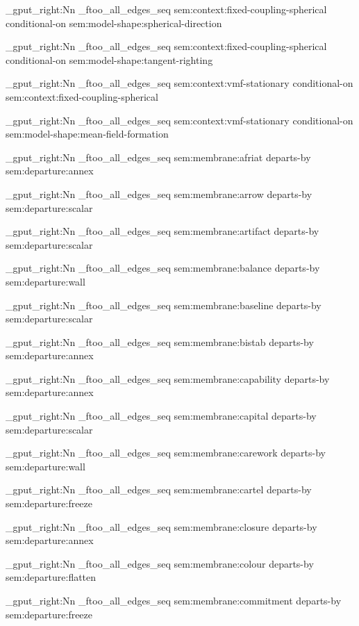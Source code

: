\seq_gput_right:Nn \g_ftoo_all_edges_seq { { sem:context:fixed-coupling-spherical } { conditional-on } { sem:model-shape:spherical-direction } }

\seq_gput_right:Nn \g_ftoo_all_edges_seq { { sem:context:fixed-coupling-spherical } { conditional-on } { sem:model-shape:tangent-righting } }

\seq_gput_right:Nn \g_ftoo_all_edges_seq { { sem:context:vmf-stationary } { conditional-on } { sem:context:fixed-coupling-spherical } }

\seq_gput_right:Nn \g_ftoo_all_edges_seq { { sem:context:vmf-stationary } { conditional-on } { sem:model-shape:mean-field-formation } }

\seq_gput_right:Nn \g_ftoo_all_edges_seq { { sem:membrane:afriat } { departs-by } { sem:departure:annex } }

\seq_gput_right:Nn \g_ftoo_all_edges_seq { { sem:membrane:arrow } { departs-by } { sem:departure:scalar } }

\seq_gput_right:Nn \g_ftoo_all_edges_seq { { sem:membrane:artifact } { departs-by } { sem:departure:scalar } }

\seq_gput_right:Nn \g_ftoo_all_edges_seq { { sem:membrane:balance } { departs-by } { sem:departure:wall } }

\seq_gput_right:Nn \g_ftoo_all_edges_seq { { sem:membrane:baseline } { departs-by } { sem:departure:scalar } }

\seq_gput_right:Nn \g_ftoo_all_edges_seq { { sem:membrane:bistab } { departs-by } { sem:departure:annex } }

\seq_gput_right:Nn \g_ftoo_all_edges_seq { { sem:membrane:capability } { departs-by } { sem:departure:annex } }

\seq_gput_right:Nn \g_ftoo_all_edges_seq { { sem:membrane:capital } { departs-by } { sem:departure:scalar } }

\seq_gput_right:Nn \g_ftoo_all_edges_seq { { sem:membrane:carework } { departs-by } { sem:departure:wall } }

\seq_gput_right:Nn \g_ftoo_all_edges_seq { { sem:membrane:cartel } { departs-by } { sem:departure:freeze } }

\seq_gput_right:Nn \g_ftoo_all_edges_seq { { sem:membrane:closure } { departs-by } { sem:departure:annex } }

\seq_gput_right:Nn \g_ftoo_all_edges_seq { { sem:membrane:colour } { departs-by } { sem:departure:flatten } }

\seq_gput_right:Nn \g_ftoo_all_edges_seq { { sem:membrane:commitment } { departs-by } { sem:departure:freeze } }

